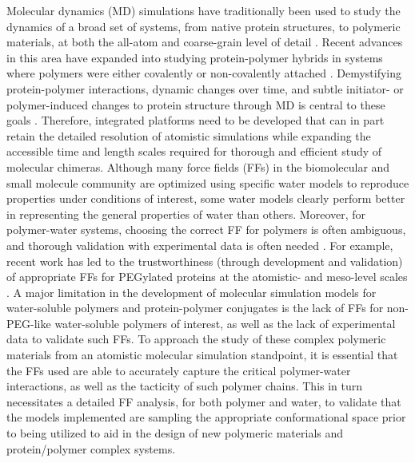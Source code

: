 \documentclass[9pt,tutorial]{livecoms}
\begin{document}
Molecular dynamics (MD) simulations have traditionally been used to study the dynamics of a broad set of systems, from native protein structures, to polymeric materials, at both the all-atom and coarse-grain level of detail \cite{Frenkel_1996, Leach_2001}. Recent advances in this area have expanded into studying protein-polymer hybrids in systems where polymers were either covalently or non-covalently attached \cite{bioconjug_nextgen}. Demystifying protein-polymer interactions, dynamic changes over time, and subtle initiator- or polymer-induced changes to protein structure through MD is central to these goals \cite{Lin2019, lak_2021}. Therefore, integrated platforms need to be developed that can in part retain the detailed resolution of atomistic simulations while expanding the accessible time and length scales required for thorough and efficient study of molecular chimeras.
Although many force fields (FFs) in the biomolecular and small molecule community are optimized using specific water models to reproduce properties under conditions of interest, some water models clearly perform better in representing the general properties of water than others. Moreover, for polymer-water systems, choosing the correct FF for polymers is often ambiguous, and thorough validation with experimental data is often needed \cite{kubota-kubota, kubota-kubota2, tacx2000, bucholz2017, Rukmani2019}.  For example, recent work has led to the trustworthiness (through development and validation) of appropriate FFs for PEGylated proteins at the atomistic- and meso-level scales \cite{farhad_2018, aravinda_peg1}. A major limitation in the development of molecular simulation models for water-soluble polymers and protein-polymer conjugates is the lack of FFs for non-PEG-like water-soluble polymers of interest, as well as the lack of experimental data to validate such FFs. To approach the study of these complex polymeric materials from an atomistic molecular simulation standpoint, it is essential that the FFs used are able to accurately capture the critical polymer-water interactions, as well as the tacticity of such polymer chains.  This in turn necessitates a detailed FF analysis, for both polymer and water, to validate that the models implemented are sampling the appropriate conformational space prior to being utilized to aid in the design of new polymeric materials and protein/polymer complex systems. 
\end{document}
